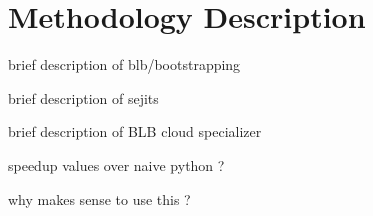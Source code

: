 \section{Methodology Description}


brief description of blb/bootstrapping

brief description of sejits 

brief description of BLB cloud specializer 

speedup values over naive python ?

why makes sense to use this ?

